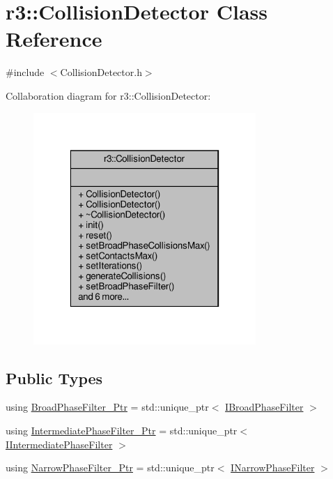 \hypertarget{classr3_1_1_collision_detector}{}\section{r3\+:\+:Collision\+Detector Class Reference}
\label{classr3_1_1_collision_detector}


{\ttfamily \#include $<$Collision\+Detector.\+h$>$}



Collaboration diagram for r3\+:\+:Collision\+Detector\+:\nopagebreak
\begin{figure}[H]
\begin{center}
\leavevmode
\includegraphics[width=239pt]{classr3_1_1_collision_detector__coll__graph}
\end{center}
\end{figure}
\subsection*{Public Types}
\begin{DoxyCompactItemize}
\item 
using \mbox{\hyperlink{classr3_1_1_collision_detector_aa8ed51d53c6f6ce545c93ad0e356d6de}{Broad\+Phase\+Filter\+\_\+\+Ptr}} = std\+::unique\+\_\+ptr$<$ \mbox{\hyperlink{classr3_1_1_i_broad_phase_filter}{I\+Broad\+Phase\+Filter}} $>$
\item 
using \mbox{\hyperlink{classr3_1_1_collision_detector_a8337c2c23ec77350b65977e043c07827}{Intermediate\+Phase\+Filter\+\_\+\+Ptr}} = std\+::unique\+\_\+ptr$<$ \mbox{\hyperlink{classr3_1_1_i_intermediate_phase_filter}{I\+Intermediate\+Phase\+Filter}} $>$
\item 
using \mbox{\hyperlink{classr3_1_1_collision_detector_a094cc287cba14d5a063cfca41e667008}{Narrow\+Phase\+Filter\+\_\+\+Ptr}} = std\+::unique\+\_\+ptr$<$ \mbox{\hyperlink{classr3_1_1_i_narrow_phase_filter}{I\+Narrow\+Phase\+Filter}} $>$
\end{DoxyCompactItemize}
